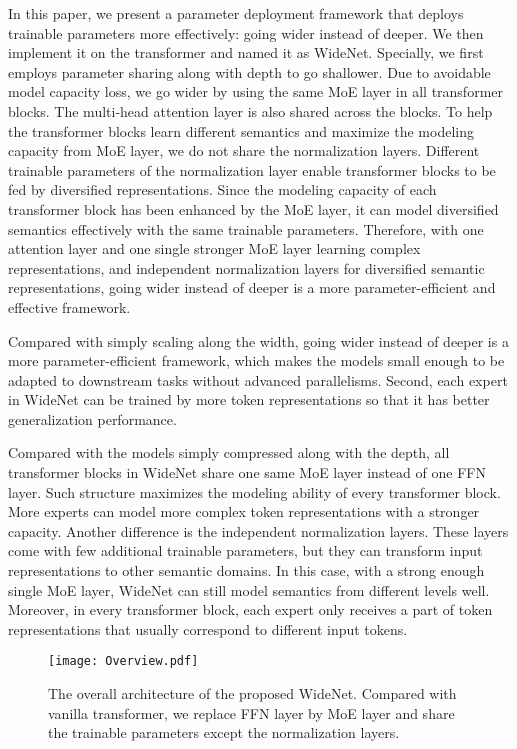 \documentclass[letterpaper]{article} \usepackage{aaai22}  \usepackage{times}  \usepackage{helvet}  \usepackage{courier}  \usepackage[hyphens]{url}  \usepackage{graphicx} \urlstyle{rm} \def\UrlFont{\rm}  \usepackage{natbib}  \usepackage{caption} \DeclareCaptionStyle{ruled}{labelfont=normalfont,labelsep=colon,strut=off} \frenchspacing  \setlength{\pdfpagewidth}{8.5in}  \setlength{\pdfpageheight}{11in}  \usepackage{algorithm}
\begin{document}
In this paper, we present a parameter deployment framework that deploys trainable parameters more effectively: going wider instead of deeper. We then implement it on the transformer and named it as WideNet.  Specially, we first employs parameter sharing along with depth to go shallower. Due to avoidable model capacity loss, we go wider by using the same MoE layer in all transformer blocks. The multi-head attention layer is also shared across the blocks. To help the transformer blocks learn different semantics and maximize the modeling capacity from MoE layer, we do not share the normalization layers. Different trainable parameters of the normalization layer enable transformer blocks to be fed by diversified representations. Since the modeling capacity of each transformer block has been enhanced by the MoE layer, it can model diversified semantics effectively with the same trainable parameters. Therefore, with one attention layer and one single stronger MoE layer learning complex representations, and independent normalization layers for diversified semantic representations, going wider instead of deeper is a more parameter-efficient and effective framework. 


Compared with simply scaling along the width, going wider instead of deeper is a more parameter-efficient framework, which makes the models small enough to be adapted to downstream tasks without advanced parallelisms. Second, each expert in WideNet can be trained by more token representations so that it has better generalization performance. 


Compared with the models simply compressed along with the depth, all transformer blocks in WideNet share one same MoE layer instead of one FFN layer. Such structure maximizes the modeling ability of every transformer block. More experts can model more complex token representations with a stronger capacity. Another difference is the independent normalization layers. These layers come with few additional trainable parameters, but they can transform input representations to other semantic domains. In this case, with a strong enough single MoE layer, WideNet can still model semantics from different levels well. Moreover, in every transformer block, each expert only receives a part of token representations that usually correspond to different input tokens. 

\begin{figure*}[t]
\centering
\texttt{[image: Overview.pdf]}
\caption{The overall architecture of the proposed WideNet. Compared with vanilla transformer, we replace FFN layer by MoE layer and share the trainable parameters except the normalization layers.}
\label{fig:overview}
\end{figure*}
\end{document}

